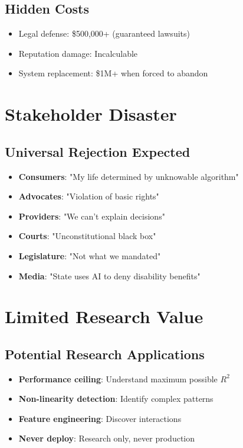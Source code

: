 \subsection{Hidden Costs}

\begin{itemize}
    \item Legal defense: \$500,000+ (guaranteed lawsuits)
    \item Reputation damage: Incalculable
    \item System replacement: \$1M+ when forced to abandon
\end{itemize}

\section{Stakeholder Disaster}

\subsection{Universal Rejection Expected}

\begin{itemize}
    \item \textbf{Consumers}: "My life determined by unknowable algorithm"
    \item \textbf{Advocates}: "Violation of basic rights"
    \item \textbf{Providers}: "We can't explain decisions"
    \item \textbf{Courts}: "Unconstitutional black box"
    \item \textbf{Legislature}: "Not what we mandated"
    \item \textbf{Media}: "State uses AI to deny disability benefits"
\end{itemize}

\section{Limited Research Value}

\subsection{Potential Research Applications}

\begin{itemize}
    \item \textbf{Performance ceiling}: Understand maximum possible $R^2$
    \item \textbf{Non-linearity detection}: Identify complex patterns
    \item \textbf{Feature engineering}: Discover interactions
    \item \textbf{Never deploy}: Research only, never production
\end{itemize}

